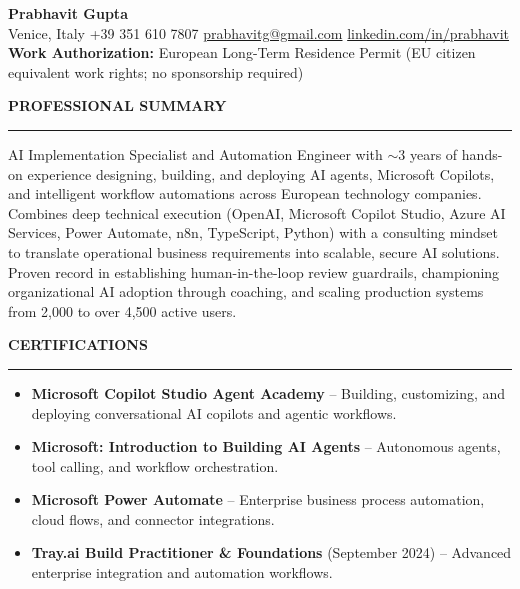 \documentclass[10pt,a4paper]{article}
\newcommand{\cvsection}[1]{%
  \vspace{6pt}%
  {\large\bfseries\MakeUppercase{#1}}%
  \vspace{2pt}%
  \hrule%
  \vspace{4pt}%
}
\begin{document}
\newpage
\pagestyle{plain}


\begin{center}
  {\Huge\bfseries Prabhavit Gupta}\\[4pt]
  Venice, Italy \textbar{} +39 351 610 7807 \textbar{} \href{mailto:prabhavitg@gmail.com}{prabhavitg@gmail.com} \textbar{} \href{https://www.linkedin.com/in/prabhavit}{linkedin.com/in/prabhavit}\\[2pt]
  \textbf{Work Authorization:} European Long-Term Residence Permit (EU citizen equivalent work rights; no sponsorship required)
\end{center}

\vspace{-4pt}

\cvsection{Professional Summary}
AI Implementation Specialist and Automation Engineer with $\sim$3 years of hands-on experience designing, building, and deploying AI agents, Microsoft Copilots, and intelligent workflow automations across European technology companies. Combines deep technical execution (OpenAI, Microsoft Copilot Studio, Azure AI Services, Power Automate, n8n, TypeScript, Python) with a consulting mindset to translate operational business requirements into scalable, secure AI solutions. Proven record in establishing human-in-the-loop review guardrails, championing organizational AI adoption through coaching, and scaling production systems from 2,000 to over 4,500 active users.

\cvsection{Certifications}
\begin{itemize}[leftmargin=*, noitemsep, topsep=1pt]
  \item \textbf{Microsoft Copilot Studio Agent Academy} -- Building, customizing, and deploying conversational AI copilots and agentic workflows.
  \item \textbf{Microsoft: Introduction to Building AI Agents} -- Autonomous agents, tool calling, and workflow orchestration.
  \item \textbf{Microsoft Power Automate} -- Enterprise business process automation, cloud flows, and connector integrations.
  \item \textbf{Tray.ai Build Practitioner \& Foundations} (September 2024) -- Advanced enterprise integration and automation workflows.
\end{itemize}
\end{document}

